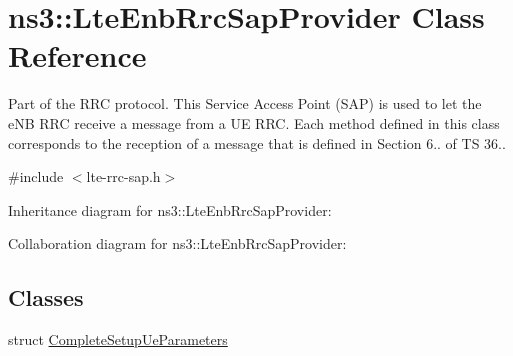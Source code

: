 \hypertarget{classns3_1_1LteEnbRrcSapProvider}{}\section{ns3\+:\+:Lte\+Enb\+Rrc\+Sap\+Provider Class Reference}
\label{classns3_1_1LteEnbRrcSapProvider}


Part of the R\+RC protocol. This Service Access Point (S\+AP) is used to let the e\+NB R\+RC receive a message from a UE R\+RC. Each method defined in this class corresponds to the reception of a message that is defined in Section 6.. of TS 36..  




{\ttfamily \#include $<$lte-\/rrc-\/sap.\+h$>$}



Inheritance diagram for ns3\+:\+:Lte\+Enb\+Rrc\+Sap\+Provider\+:


Collaboration diagram for ns3\+:\+:Lte\+Enb\+Rrc\+Sap\+Provider\+:
\subsection*{Classes}
\begin{DoxyCompactItemize}
\item 
struct \hyperlink{structns3_1_1LteEnbRrcSapProvider_1_1CompleteSetupUeParameters}{Complete\+Setup\+Ue\+Parameters}
\end{DoxyCompactItemize}
